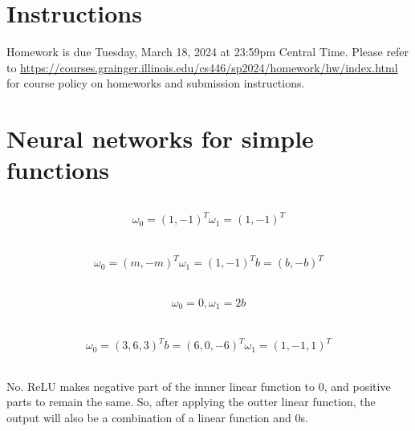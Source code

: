 \documentclass[12pt]{article}
\begin{document}
\singlespacing

\renewcommand{\familydefault}{\rmdefault}


\section{Instructions}

Homework is due Tuesday, March 18, 2024 at 23:59pm Central Time.
Please refer to \url{https://courses.grainger.illinois.edu/cs446/sp2024/homework/hw/index.html} for course policy on homeworks and submission instructions.

\section{Neural networks for simple functions}
\subsection{}
\begin{eqnarray}
    \omega_{0} = (1, -1)^T  \omega_{1} = (1, -1)^T \nonumber
\end{eqnarray}

\subsection{}
\begin{eqnarray}
    \omega_{0} = (m, -m)^T  \omega_{1} = (1, -1)^T b = (b, -b)^T \nonumber
\end{eqnarray}

\subsection{}
\begin{eqnarray}
    \omega_{0} = 0,  \omega_{1} = 2b  \nonumber
\end{eqnarray}

\subsection{}
\begin{eqnarray}
    \omega_{0} = (3, 6, 3)^T b = (6, 0, -6)^T \omega_{1} = (1, -1, 1)^T \nonumber
\end{eqnarray}

\subsection{}
No. ReLU makes negative part of the innner linear function to 0, and positive parts to remain the same. So, after applying the outter linear function, the output will also be a combination of a linear function and 0s.
\end{document}
